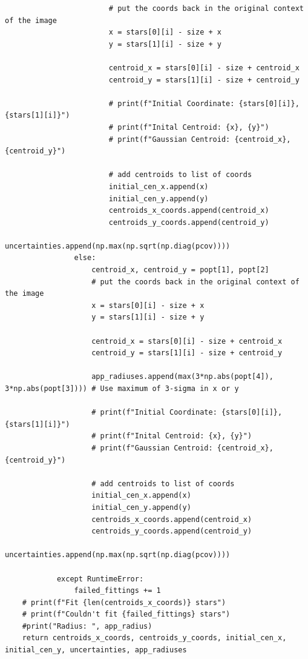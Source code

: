 \documentclass{article}
\begin{document}
\begin{appendices}
\begin{scriptsize}
\begin{verbatim}
                        # put the coords back in the original context of the image
                        x = stars[0][i] - size + x
                        y = stars[1][i] - size + y
                        
                        centroid_x = stars[0][i] - size + centroid_x
                        centroid_y = stars[1][i] - size + centroid_y
                        
                        # print(f"Initial Coordinate: {stars[0][i]}, {stars[1][i]}")
                        # print(f"Inital Centroid: {x}, {y}")
                        # print(f"Gaussian Centroid: {centroid_x}, {centroid_y}")
                        
                        # add centroids to list of coords
                        initial_cen_x.append(x)
                        initial_cen_y.append(y)
                        centroids_x_coords.append(centroid_x)
                        centroids_y_coords.append(centroid_y)
                        uncertainties.append(np.max(np.sqrt(np.diag(pcov))))
                else:
                    centroid_x, centroid_y = popt[1], popt[2]
                    # put the coords back in the original context of the image
                    x = stars[0][i] - size + x
                    y = stars[1][i] - size + y
                    
                    centroid_x = stars[0][i] - size + centroid_x
                    centroid_y = stars[1][i] - size + centroid_y
                    
                    app_radiuses.append(max(3*np.abs(popt[4]), 3*np.abs(popt[3]))) # Use maximum of 3-sigma in x or y                     
                    
                    # print(f"Initial Coordinate: {stars[0][i]}, {stars[1][i]}")
                    # print(f"Inital Centroid: {x}, {y}")
                    # print(f"Gaussian Centroid: {centroid_x}, {centroid_y}")
                    
                    # add centroids to list of coords
                    initial_cen_x.append(x)
                    initial_cen_y.append(y)
                    centroids_x_coords.append(centroid_x)
                    centroids_y_coords.append(centroid_y)
                    uncertainties.append(np.max(np.sqrt(np.diag(pcov))))
                
            except RuntimeError:
                failed_fittings += 1
    # print(f"Fit {len(centroids_x_coords)} stars")
    # print(f"Couldn't fit {failed_fittings} stars")
    #print("Radius: ", app_radius)
    return centroids_x_coords, centroids_y_coords, initial_cen_x, initial_cen_y, uncertainties, app_radiuses
\end{verbatim}
\end{scriptsize}


\end{appendices}
\end{document}
